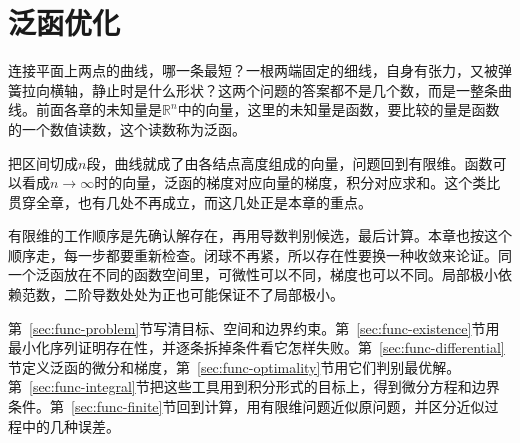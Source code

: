 \chapter{泛函优化}
\label{chap:functional-optimization-variation}

连接平面上两点的曲线，哪一条最短？一根两端固定的细线，自身有张力，又被弹簧拉向横轴，静止时是什么形状？这两个问题的答案都不是几个数，而是一整条曲线。前面各章的未知量是$\mathbb{R}^n$中的向量，这里的未知量是函数，要比较的量是函数的一个数值读数，这个读数称为泛函。

把区间切成$n$段，曲线就成了由各结点高度组成的向量，问题回到有限维。函数可以看成$n\to\infty$时的向量，泛函的梯度对应向量的梯度，积分对应求和。这个类比贯穿全章，也有几处不再成立，而这几处正是本章的重点。

有限维的工作顺序是先确认解存在，再用导数判别候选，最后计算。本章也按这个顺序走，每一步都要重新检查。闭球不再紧，所以存在性要换一种收敛来论证。同一个泛函放在不同的函数空间里，可微性可以不同，梯度也可以不同。局部极小依赖范数，二阶导数处处为正也可能保证不了局部极小。

第~\ref{sec:func-problem}节写清目标、空间和边界约束。第~\ref{sec:func-existence}节用最小化序列证明存在性，并逐条拆掉条件看它怎样失败。第~\ref{sec:func-differential}节定义泛函的微分和梯度，第~\ref{sec:func-optimality}节用它们判别最优解。第~\ref{sec:func-integral}节把这些工具用到积分形式的目标上，得到微分方程和边界条件。第~\ref{sec:func-finite}节回到计算，用有限维问题近似原问题，并区分近似过程中的几种误差。








